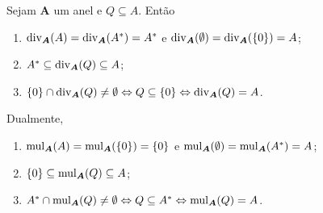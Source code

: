\begin{prop}
	Sejam $\bm A$ um anel e $Q \subseteq A$. Então
	\begin{enumerate}
	\item $\operatorname{div}_{\bm A}(A) = \operatorname{div}_{\bm A}(A^*) = A^*$ e $\operatorname{div}_{\bm A}(\emptyset) = \operatorname{div}_{\bm A}(\{0\}) = A$;
	\item $A^* \subseteq \operatorname{div}_{\bm A}(Q) \subseteq A$;
	\item $\{0\} \cap \operatorname{div}_{\bm A}(Q) \neq \emptyset \Leftrightarrow Q \subseteq \{0\} \Leftrightarrow \operatorname{div}_{\bm A}(Q)=A$.
	\end{enumerate}

	Dualmente,
	\begin{enumerate}
	\item $\operatorname{mul}_{\bm A}(A) = \operatorname{mul}_{\bm A}(\{0\}) = \{0\}$ e $\operatorname{mul}_{\bm A}(\emptyset) = \operatorname{mul}_{\bm A}(A^*) = A$;
	\item $\{0\} \subseteq \operatorname{mul}_{\bm A}(Q) \subseteq A$;
	\item $A^* \cap \operatorname{mul}_{\bm A}(Q) \neq \emptyset \Leftrightarrow Q \subseteq A^* \Leftrightarrow \operatorname{mul}_{\bm A}(Q) = A$.
	\end{enumerate}
\end{prop}
